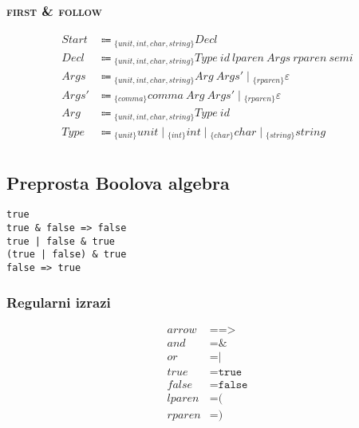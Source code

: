 \documentclass{report}
\newcommand{\Null}{\varepsilon}
\newcommand{\Char}[1]{\texttt{#1}}
\newcommand{\Spc}{\ }
\newcommand{\Union}{\mathrel{|}}
\newcommand{\FIRST}{\textsc{first}}
\newcommand{\FOLLOW}{\textsc{follow}}
\newcommand{\Arrow}{\Coloneq}
\newcommand{\NT}[1]{{#1}}
\newcommand{\T}[1]{{#1}}
\newcommand{\Lookahead}[1]{{}_{\{{#1}\}}}
\begin{document}
\subsubsection*{{\FIRST} \& {\FOLLOW}}
\begin{equation*}
  \begin{aligned}
    \NT{Start} &\Arrow \Lookahead{\T{unit}, \T{int}, \T{char}, \T{string}} \NT{Decl}\\
    \NT{Decl} &\Arrow \Lookahead{\T{unit}, \T{int}, \T{char}, \T{string}} \NT{Type} \Spc \T{id} \Spc \T{lparen} \Spc \NT{Args} \Spc \T{rparen} \Spc \T{semi}\\
    \NT{Args} &\Arrow \Lookahead{\T{unit}, \T{int}, \T{char}, \T{string}} \NT{Arg} \Spc \NT{Args'} \Union \Lookahead{\T{rparen}} \Null\\
    \NT{Args'} &\Arrow \Lookahead{\T{comma}} \T{comma} \Spc \NT{Arg} \Spc \NT{Args'} \Union \Lookahead{\T{rparen}} \Null \\
    \NT{Arg} &\Arrow \Lookahead{\T{unit}, \T{int}, \T{char}, \T{string}} \NT{Type} \Spc \T{id}\\
    \NT{Type} &\Arrow \Lookahead{\T{unit}} \T{unit} \Union \Lookahead{\T{int}} \T{int} \Union \Lookahead{\T{char}} \T{char} \Union \Lookahead{\T{string}} \T{string}\\
  \end{aligned}
\end{equation*}

\subsection{Preprosta Boolova algebra}
\begin{verbatim}
true
true & false => false
true | false & true
(true | false) & true
false => true
\end{verbatim}

\subsubsection*{Regularni izrazi}
\begin{equation*}
  \begin{aligned}
    \T{arrow} &= \Char{=>}\\
    \T{and} &= \Char{\&}\\
    \T{or} &= \Char{|}\\
    \T{true} &= \Char{true}\\
    \T{false} &= \Char{false}\\
    \T{lparen} &= \Char{(}\\
    \T{rparen} &= \Char{)}\\
  \end{aligned}
\end{equation*}
\end{document}
